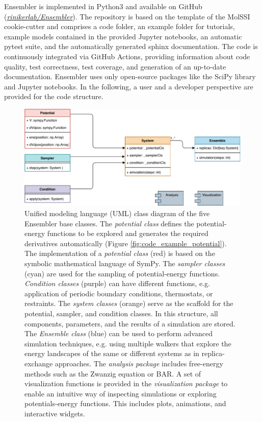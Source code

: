 
Ensembler is implemented in Python3\cite{VanRossum2009} and available on GitHub\cite{Github2020}  (\textit{\hyperlink{https://github.com/rinikerlab/Ensembler}{rinikerlab/Ensembler}}). 
The repository is based on the template of the MolSSI cookie-cutter\cite{Naden2018} and comprises a code folder, an example folder for tutorials, example models contained in the provided Jupyter notebooks,\cite{Kluyver2016} an automatic pytest suite,\cite{Krekel2004} and the automatically generated sphinx \cite{Brandl2008} documentation. 
The code is continuously integrated via GitHub Actions,\cite{githhubAction20} providing information about code quality, test correctness, test coverage, and generation of an up-to-date documentation. 
Ensembler uses only open-source packages like the SciPy library\cite{Virtanen2020, VanDerWalt2011, Meurer2017, Mckinney2010, Hunter2007} and Jupyter notebooks.\cite{Kluyver2016} 
In the following, a user and a developer perspective are provided for the code structure. 


\begin{figure}[ht]
	\includegraphics[width=\textwidth]{fig/implementation/export.pdf}
	\caption{Unified modeling language (UML) class diagram of the five Ensembler base classes. The \textit{potential class} defines the potential-energy functions to be explored and generates the required derivatives automatically (Figure \ref{fig:code_example_potential}). The implementation of a \textit{potential class} (red) is based on the symbolic mathematical language of SymPy.\cite{Meurer2017} The \textit{sampler classes} (cyan) are used for the sampling of potential-energy functions. \textit{Condition classes} (purple) can have different functions, e.g. application of periodic boundary conditions,\cite{Cheatham1995, Leach2001} thermostats, or restraints. The \textit{system classes} (orange) serve as the scaffold for the potential, sampler, and condition classes. In this structure, all components, parameters, and the results of a simulation are stored. The \textit{Ensemble class} (blue) can be used to perform advanced simulation techniques, e.g. using multiple walkers that explore the energy landscapes of the same or different systems as in replica-exchange approaches.\cite{Sugita1999, Sugita2000, Yamauchi2017} The \textit{analysis package} includes free-energy methods such as the Zwanzig equation\cite{Zwanzig1954} or BAR\cite{Bennett1976}. A set of visualization functions is provided in the \textit{visualization package} to enable an intuitive way of inspecting simulations or exploring potentials-energy functions. This includes plots, animations, and interactive widgets.}
	\label{fig:UML-Diagramm}
\end{figure}


